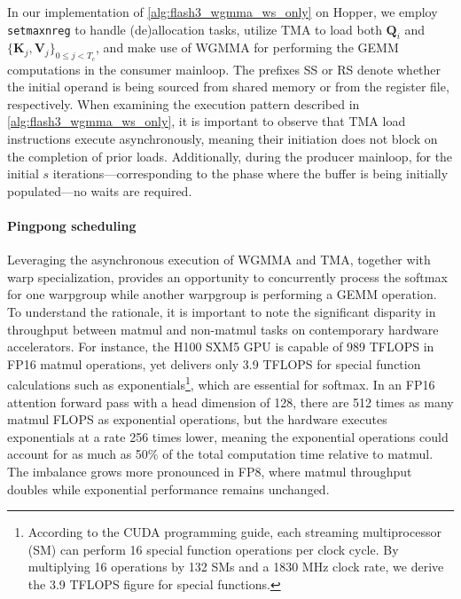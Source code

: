 In our implementation of \cref{alg:flash3_wgmma_ws_only} on Hopper, we employ \verb|setmaxnreg| to handle (de)allocation tasks, utilize TMA to load both $\mathbf{Q}_i$ and $\{ \mathbf{K}_j, \mathbf{V}_j \}_{0 \leq j < T_c}$, and make use of WGMMA for performing the GEMM computations in the consumer mainloop. The prefixes SS or RS denote whether the initial operand is being sourced from shared memory or from the register file, respectively. When examining the execution pattern described in \cref{alg:flash3_wgmma_ws_only}, it is important to observe that TMA load instructions execute asynchronously, meaning their initiation does not block on the completion of prior loads. Additionally, during the producer mainloop, for the initial $s$ iterations—corresponding to the phase where the buffer is being initially populated—no waits are required.

\paragraph{Pingpong scheduling} Leveraging the asynchronous execution of WGMMA and TMA, together with warp specialization, provides an opportunity to concurrently process the softmax for one warpgroup while another warpgroup is performing a GEMM operation. To understand the rationale, it is important to note the significant disparity in throughput between matmul and non-matmul tasks on contemporary hardware accelerators. For instance, the H100 SXM5 GPU is capable of 989 TFLOPS in FP16 matmul operations, yet delivers only 3.9 TFLOPS for special function calculations such as exponentials\footnote{According to the CUDA programming guide, each streaming multiprocessor (SM) can perform 16 special function operations per clock cycle. By multiplying 16 operations by 132 SMs and a 1830 MHz clock rate, we derive the 3.9 TFLOPS figure for special functions.}, which are essential for softmax. In an FP16 attention forward pass with a head dimension of 128, there are 512 times as many matmul FLOPS as exponential operations, but the hardware executes exponentials at a rate 256 times lower, meaning the exponential operations could account for as much as 50\% of the total computation time relative to matmul. The imbalance grows more pronounced in FP8, where matmul throughput doubles while exponential performance remains unchanged.

